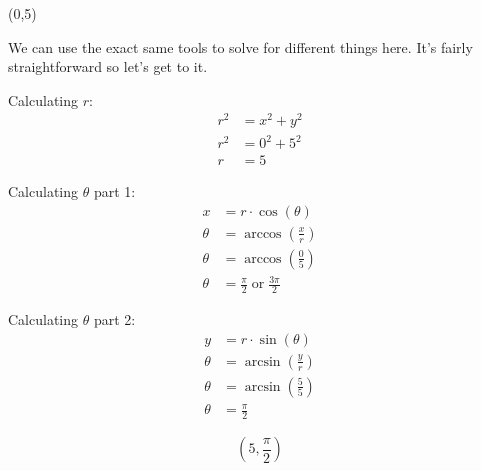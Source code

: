 \begin{problem}[37]
    (0,5)
\end{problem}

\begin{solution}
    We can use the exact same tools to solve for different things here. It's fairly straightforward so let's get to it. \medskip
    
    Calculating $r$: 
    \begin{align}
        r^2 &= x^2 + y^2 \\
        r^2 &= 0^2 + 5^2 \\
        r &= 5
    \end{align}
    
    Calculating $\theta$ part 1:
    \begin{align}
        x &= r \cdot \cos(\theta) \\
        \theta &= \arccos \left( \frac{x}{r} \right) \\
        \theta &= \arccos \left( \frac{0}{5} \right) \\
        \theta &= \frac{\pi}{2} \; \text{or} \; \frac{3\pi}{2}
    \end{align}
    
    Calculating $\theta$ part 2:
    \begin{align}
        y &= r \cdot \sin(\theta) \\
        \theta &= \arcsin \left( \frac{y}{r} \right) \\
        \theta &= \arcsin \left( \frac{5}{5} \right) \\
        \theta &= \frac{\pi}{2}
    \end{align}
    
    \[\boxed{ \left( 5, \frac{\pi}{2} \right)}\]
\end{solution}